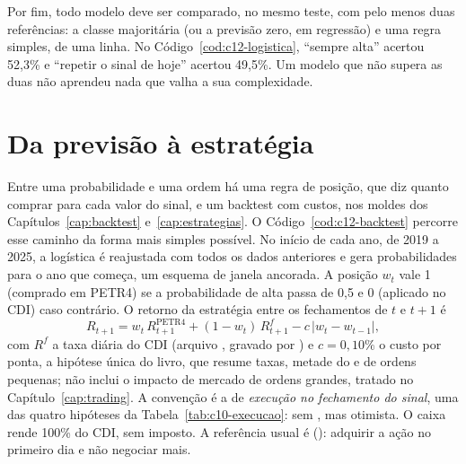 Por fim, todo modelo deve ser comparado, no mesmo teste, com pelo menos duas referências: a classe majoritária (ou a previsão zero, em regressão) e uma regra simples, de uma linha. No Código~\ref{cod:c12-logistica}, ``sempre alta'' acertou 52,3\% e ``repetir o sinal de hoje'' acertou 49,5\%. Um modelo que não supera as duas não aprendeu nada que valha a sua complexidade.

\section{Da previsão à estratégia}

Entre uma probabilidade e uma ordem há uma regra de posição, que diz quanto comprar para cada valor do sinal, e um backtest com custos, nos moldes dos Capítulos~\ref{cap:backtest} e~\ref{cap:estrategias}. O Código~\ref{cod:c12-backtest} percorre esse caminho da forma mais simples possível. No início de cada ano, de 2019 a 2025, a logística é reajustada com todos os dados anteriores e gera probabilidades para o ano que começa, um esquema  de janela ancorada. A posição $w_t$ vale 1 (comprado em PETR4) se a probabilidade de alta passa de 0,5 e 0 (aplicado no CDI) caso contrário. O retorno da estratégia entre os fechamentos de $t$ e $t+1$ é
\begin{equation}
  R_{t+1} = w_t\,R^{\text{PETR4}}_{t+1} + (1 - w_t)\,R^f_{t+1} - c\,\lvert w_t - w_{t-1} \rvert ,
  \label{eq:c12-estrategia}
\end{equation}
com $R^f$ a taxa diária do CDI (arquivo , gravado por ) e $c = 0,10\%$ o custo por ponta, a hipótese única do livro, que resume taxas, metade do  e  de ordens pequenas; não inclui o impacto de mercado de ordens grandes, tratado no Capítulo~\ref{cap:trading}. A convenção é a de \emph{execução no fechamento do sinal}, uma das quatro hipóteses da Tabela~\ref{tab:c10-execucao}: sem , mas otimista. O caixa rende 100\% do CDI, sem imposto. A referência usual é  (): adquirir a ação no primeiro dia e não negociar mais.


